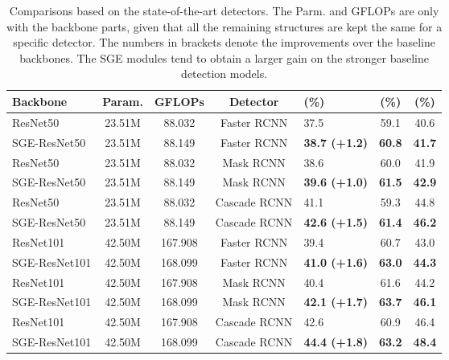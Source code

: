 \documentclass{article}
\begin{document}
	\begin{table}
\small
		\centering
		\renewcommand\arraystretch{1.2}
		\newcommand{\tabincell}[2]{\begin{tabular}{@{}#1@{}}#2\end{tabular}}
		\caption{Comparisons based on the state-of-the-art detectors. The Parm. and GFLOPs are only with the backbone parts, given that all the remaining structures are kept the same for a specific detector. The numbers in brackets denote the improvements over the baseline backbones. The SGE modules tend to obtain a larger gain on the stronger baseline detection models. }
		\begin{tabular}{l|c|c|c|l|c|c}
			\hline
			Backbone&  Param. & GFLOPs & Detector &  (\%) &  (\%) &  (\%) \\
			\hline
			ResNet50 \cite{he2016deep} & 23.51M & 88.032 & Faster RCNN \cite{ren2015faster} & 37.5 & 59.1 & 40.6\\ SGE-ResNet50 & 23.51M & 88.149
			& Faster RCNN \cite{ren2015faster} & \bf 38.7 {\scriptsize(+1.2)}& \bf 60.8 & \bf 41.7\\
			\hline
			ResNet50 \cite{he2016deep} & 23.51M & 88.032 &Mask RCNN \cite{he2017mask} & 38.6 & 60.0 & 41.9\\ SGE-ResNet50 & 23.51M & 88.149 &Mask RCNN \cite{he2017mask} & \bf 39.6 {\scriptsize(+1.0)} & \bf 61.5 & \bf 42.9\\ 
			\hline
			ResNet50 \cite{he2016deep} & 23.51M & 88.032 &Cascade RCNN \cite{cai2018cascade}&41.1&59.3& 44.8\\  SGE-ResNet50 & 23.51M & 88.149 &Cascade RCNN \cite{cai2018cascade}& \bf 42.6 {\scriptsize(+1.5)}&  \bf 61.4& \bf 46.2\\ 
			\hline\hline
			ResNet101 \cite{he2016deep} & 42.50M & 167.908 &Faster RCNN \cite{ren2015faster}& 39.4 & 60.7 & 43.0 \\ SGE-ResNet101 & 42.50M & 168.099 &Faster RCNN \cite{ren2015faster}& \bf 41.0 {\scriptsize(+1.6)} & \bf 63.0 & \bf 44.3 \\  \hline
			ResNet101 \cite{he2016deep} & 42.50M & 167.908 &Mask RCNN \cite{he2017mask}& 40.4 & 61.6 & 44.2 \\ SGE-ResNet101 & 42.50M & 168.099 &Mask RCNN \cite{he2017mask}& \bf 42.1 {\scriptsize(+1.7)} & \bf 63.7 & \bf 46.1\\ \hline
			ResNet101 \cite{he2016deep} & 42.50M & 167.908 &Cascade RCNN \cite{cai2018cascade} & 42.6 & 60.9 & 46.4 \\ SGE-ResNet101 & 42.50M & 168.099 &Cascade RCNN \cite{cai2018cascade} & \bf 44.4 {\scriptsize(+1.8)} & \bf 63.2 & \bf 48.4 \\ \hline
		\end{tabular}
\label{tab_compare_detectors}
		\vspace{-10pt}
	\end{table}
	
\end{document}
